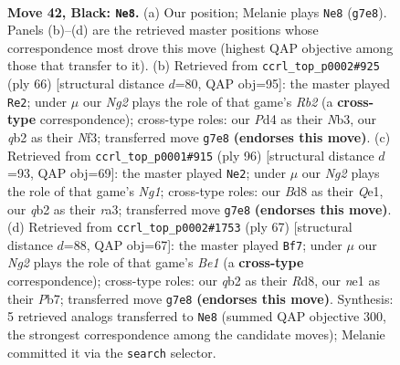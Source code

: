 \documentclass[11pt]{article}
\begin{document}
\begin{figure}[p]
\label{fig:thought-m81}
\end{figure}

\clearpage

\begin{figure}[p]\centering
\begin{subfigure}{0.46\textwidth}\centering
\resizebox{\linewidth}{!}{%
\newchessgame
\chessboard[
  setfen={n1rb2k1/1q4n1/p4r2/P1p2p1p/3p1Pp1/1P4P1/1QRBP2P/R2NN1K1 b - - 1 42},
  showmover=false,
  pgfstyle=straightmove, color=movearrow, markmove={g7-e8}
]}
\caption{}
\end{subfigure}\hfill
\begin{subfigure}{0.46\textwidth}\centering
\resizebox{\linewidth}{!}{%
\newchessgame
\chessboard[
  setfen={1r4rk/2p1b3/p2pn1q1/P3p2p/2P1Pp2/1NQ2N1P/1R3PP1/6RK w - - 21 34},
  showmover=false,
  pgfstyle=straightmove, color=movearrow, markmove={b2-e2}
]}
\caption{}
\end{subfigure}
\\[4pt]
\begin{subfigure}{0.46\textwidth}\centering
\resizebox{\linewidth}{!}{%
\newchessgame
\chessboard[
  setfen={3r4/q4nk1/3pbpp1/1p2p2p/1P2P2P/r1PRNP2/6P1/3RQ1NK w - - 8 49},
  showmover=false,
  pgfstyle=straightmove, color=movearrow, markmove={g1-e2}
]}
\caption{}
\end{subfigure}\hfill
\begin{subfigure}{0.46\textwidth}\centering
\resizebox{\linewidth}{!}{%
\newchessgame
\chessboard[
  setfen={2rrbk2/1p4p1/pqnppp1p/8/P1P1P3/1PNR3P/1Q2BPPK/5R2 b - - 3 34},
  showmover=false,
  pgfstyle=straightmove, color=movearrow, markmove={e8-f7}
]}
\caption{}
\end{subfigure}
\caption{\textbf{Move 42, Black: \texttt{Ne8}.} (a) Our position; Melanie plays \texttt{Ne8} (\texttt{g7e8}). Panels (b)--(d) are the retrieved master positions whose correspondence most drove this move (highest QAP objective among those that transfer to it). (b) Retrieved from \texttt{ccrl\_top\_p0002\#925} (ply 66) [structural distance $d$=80, QAP obj=95]: the master played \texttt{Re2}; under $\mu$ our \emph{Ng2} plays the role of that game's \emph{Rb2} (a \textbf{cross-type} correspondence); cross-type roles: our \emph{P}d4 as their \emph{N}b3, our \emph{q}b2 as their \emph{N}f3; transferred move \texttt{g7e8} \textbf{(endorses this move)}. (c) Retrieved from \texttt{ccrl\_top\_p0001\#915} (ply 96) [structural distance $d$=93, QAP obj=69]: the master played \texttt{Ne2}; under $\mu$ our \emph{Ng2} plays the role of that game's \emph{Ng1}; cross-type roles: our \emph{B}d8 as their \emph{Q}e1, our \emph{q}b2 as their \emph{r}a3; transferred move \texttt{g7e8} \textbf{(endorses this move)}. (d) Retrieved from \texttt{ccrl\_top\_p0002\#1753} (ply 67) [structural distance $d$=88, QAP obj=67]: the master played \texttt{Bf7}; under $\mu$ our \emph{Ng2} plays the role of that game's \emph{Be1} (a \textbf{cross-type} correspondence); cross-type roles: our \emph{q}b2 as their \emph{R}d8, our \emph{n}e1 as their \emph{P}b7; transferred move \texttt{g7e8} \textbf{(endorses this move)}. Synthesis: 5 retrieved analogs transferred to \texttt{Ne8} (summed QAP objective 300, the strongest correspondence among the candidate moves); Melanie committed it via the \texttt{search} selector.}

\end{figure}
\end{document}
